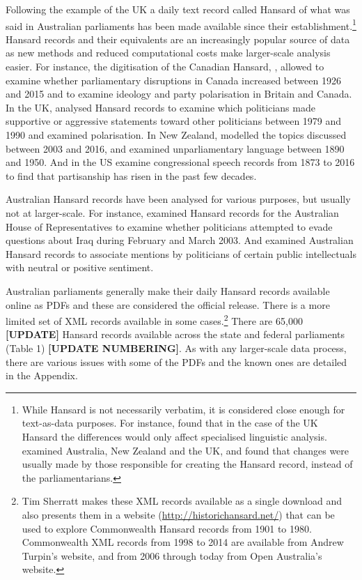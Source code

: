 \documentclass[12pt,]{article}
\theoremstyle{definition}
\theoremstyle{definition}
\theoremstyle{definition}
\theoremstyle{remark}
\begin{document}
Following the example of the UK a daily text record called Hansard of
what was said in Australian parliaments has been made available since
their establishment.\footnote{While Hansard is not necessarily verbatim,
  it is considered close enough for text-as-data purposes. For instance,
  \citet{Mollin2008} found that in the case of the UK Hansard the
  differences would only affect specialised linguistic analysis.
  \citet{Edwards2016} examined Australia, New Zealand and the UK, and
  found that changes were usually made by those responsible for creating
  the Hansard record, instead of the parliamentarians.} Hansard records
and their equivalents are an increasingly popular source of data as new
methods and reduced computational costs make larger-scale analysis
easier. For instance, the digitisation of the Canadian Hansard,
\citet{BeelenEtc2017}, allowed \citet{Whyte2017} to examine whether
parliamentary disruptions in Canada increased between 1926 and 2015 and
\citet{RheaultCochran2018} to examine ideology and party polarisation in
Britain and Canada. In the UK, \citet{Duthie2016} analysed Hansard
records to examine which politicians made supportive or aggressive
statements toward other politicians between 1979 and 1990 and
\citet{PetersonSpirling2018} examined polarisation. In New Zealand,
\citet{Curran2017} modelled the topics discussed between 2003 and 2016,
and \citet{Graham2016} examined unparliamentary language between 1890
and 1950. And in the US \citet{GentzkowShapiroTaddy2018} examine
congressional speech records from 1873 to 2016 to find that partisanship
has risen in the past few decades.

Australian Hansard records have been analysed for various purposes, but
usually not at larger-scale. For instance, \citet{Rasiah2010} examined
Hansard records for the Australian House of Representatives to examine
whether politicians attempted to evade questions about Iraq during
February and March 2003. And \citet{GansLeigh2012} examined Australian
Hansard records to associate mentions by politicians of certain public
intellectuals with neutral or positive sentiment.

Australian parliaments generally make their daily Hansard records
available online as PDFs and these are considered the official release.
There is a more limited set of XML records available in some
cases.\footnote{Tim Sherratt makes these XML records available as a
  single download and also presents them in a website
  (\url{http://historichansard.net/}) that can be used to explore
  Commonwealth Hansard records from 1901 to 1980. Commonwealth XML
  records from 1998 to 2014 are available from Andrew Turpin's website,
  and from 2006 through today from Open Australia's website.} There are
65,000 \textbf{{[}UPDATE{]}} Hansard records available across the state
and federal parliaments (Table 1) \textbf{{[}UPDATE NUMBERING{]}}. As
with any larger-scale data process, there are various issues with some
of the PDFs and the known ones are detailed in the Appendix.
\end{document}
